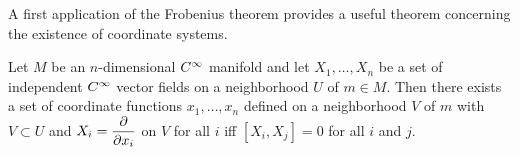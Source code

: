 \documentclass[../main]{subfiles}
\begin{document}
A first application of the Frobenius theorem provides a useful theorem concerning the existence of coordinate systems.

\begin{theorem}
Let $M$ be an $n$-dimensional $C^\infty$ manifold and let $X_{1}, \ldots, X_{n}$ be a set of independent $C^\infty$ vector fields on a neighborhood $U$ of $m\in M$. Then there exists a set of coordinate functions $x_{1}, \ldots, x_{n}$ defined on a neighborhood $V$ of $m$ with $V \subset U$ and $X_{i}=\dfrac{\partial }{\partial x_i}$ on $V$ for all $i$ iff $[X_{i}, X_{j}]=0$ for all $i$ and $j$.
\end{theorem} 
\end{document}
